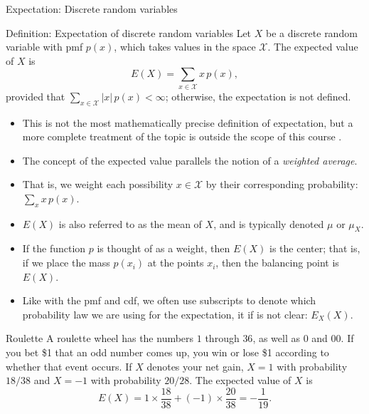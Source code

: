 \begin{frame}[allowframebreaks]{Expectation: Discrete random variables}
  \begin{block}{Definition: Expectation of discrete random variables}
    Let $X$ be a discrete random variable with pmf $p(x)$, which takes values in the space $\mathcal{X}$. The \alert{expected value} of $X$ is 
    $$
    E(X) = \sum_{x \in \mathcal{X}}x\, p(x),
    $$
    provided that $\sum_{x \in \mathcal{X}} |x|\, p(x) < \infty$; otherwise, the expectation is not defined.
  \end{block}
  \begin{itemize}
    \item This is not the most mathematically precise definition of expectation, but a more complete treatment of the topic is outside the scope of this course \citep[See][]{resnick19}.
    \item The concept of the expected value parallels the notion of a \emph{weighted average}.
    \item That is, we weight each possibility $x \in \mathcal{X}$ by their corresponding probability: $\sum_x x \, p(x)$.
    \item $E(X)$ is also referred to as the \alert{mean} of $X$, and is typically denoted $\mu$ or $\mu_X$. 
    \item If the function $p$ is thought of as a weight, then $E(X)$ is the center; that is, if we place the mass $p(x_i)$ at the points $x_i$, then the balancing point is $E(X)$.
    \item Like with the pmf and cdf, we often use subscripts to denote which probability law we are using for the expectation, it if is not clear: $E_X(X)$. 
  \end{itemize}
  
  \begin{exampleblock}{Roulette}
    A roulette wheel has the numbers $1$ through $36$, as well as $0$ and $00$. If you bet \$1 that an odd number comes up, you win or lose \$1 according to whether that event occurs. If $X$ denotes your net gain, $X = 1$ with probability $18/38$ and $X = -1$ with probability $20/28$. The expected value of $X$ is
    $$
    E(X) = 1 \times \frac{18}{38} + (-1) \times \frac{20}{38} = -\frac{1}{19}.
    $$
  \end{exampleblock}
  

\end{frame}
